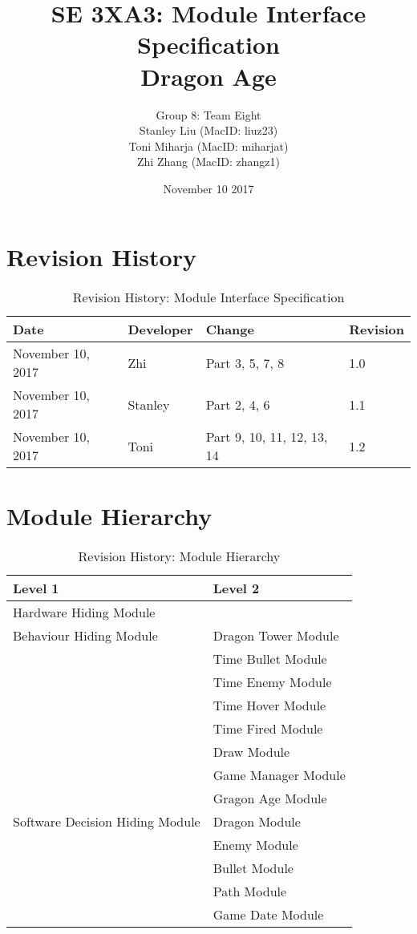 \documentclass[12,english]{article}
\title{SE 3XA3: Module Interface Specification\\
        Dragon Age}
\author{Group 8: Team Eight \\
                 Stanley Liu (MacID: liuz23) \\    
                 Toni Miharja (MacID: miharjat)\\
                 Zhi Zhang (MacID: zhangz1)}
\date{November 10 2017 }
\begin{document}
\maketitle
\newpage
\tableofcontents
\newpage
 
\section{Revision History}
\begin{table}[h!]
    \centering
    \begin{tabular}{|p{2.5cm}|p{3cm}|p{3cm}|p{2cm}|}
    \hline
    \textbf {Date}  & {Developer} & {Change} & {Revision} \\
    \hline
    November 10, 2017 & Zhi & Part 3, 5, 7, 8 & 1.0\\
    \hline
    November 10, 2017 & Stanley & Part 2, 4, 6 & 1.1\\
    \hline
    November 10, 2017 & Toni & Part 9, 10, 11, 12, 13, 14& 1.2\\
    \hline
    \end{tabular}
    \caption{Revision History: Module Interface Specification}
\end{table}
 
\section{Module Hierarchy}
\begin{table}[h!]
    \centering
    \begin{tabular}{|p{5.5cm}|p{5cm}|}
    \hline
    \textbf {Level 1}  & {Level 2} \\
    \hline
    Hardware Hiding Module &  \\
    \hline
    Behaviour Hiding Module & Dragon Tower Module\\
    & Time Bullet Module\\
    &Time Enemy Module\\
    &Time Hover Module\\
    &Time Fired Module\\
    &Draw Module\\
    &Game Manager Module\\
    &Gragon Age Module\\
    \hline
    Software Decision Hiding Module&Dragon Module\\
    & Enemy Module\\
    & Bullet Module\\
    & Path Module\\
    & Game Date Module\\
    \hline
    \end{tabular}
    \caption{Revision History: Module Hierarchy}
\end{table}
\end{document}
